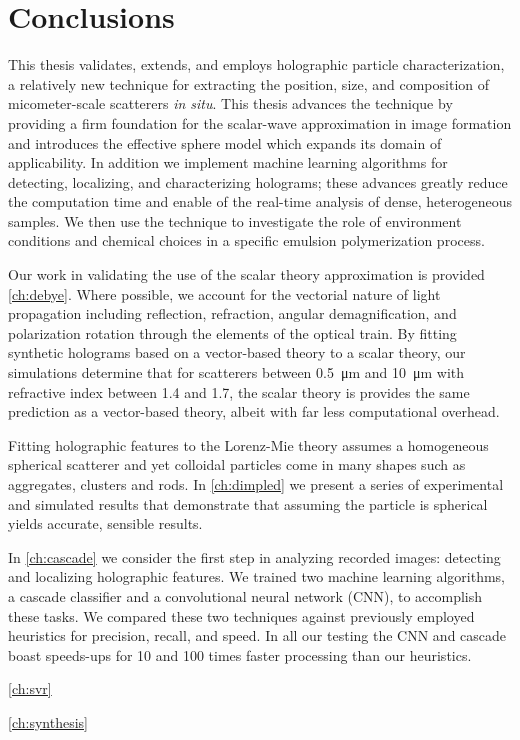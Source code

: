 \chapter{Conclusions}
\label{ch:conclusion}


This thesis validates, extends, and employs holographic
particle characterization, a relatively new technique
for extracting the position, size, and composition
of micometer-scale scatterers \emph{in situ}. This
thesis advances the technique by providing a
firm foundation for the scalar-wave approximation
in image formation and introduces the effective
sphere model which expands its domain of applicability.
In addition we implement machine learning algorithms for
detecting, localizing, and characterizing holograms; these
advances greatly reduce the computation time and enable of
the real-time analysis of dense, heterogeneous samples.
We then use the technique to investigate the role of
environment conditions and chemical choices in
a specific emulsion polymerization process.

Our work in validating the use of the scalar theory
approximation is provided \autoref{ch:debye}.
Where possible, we account for the vectorial nature
of light propagation including reflection, refraction,
angular demagnification, and polarization rotation
through the elements of the optical train. By fitting synthetic holograms
based on a vector-based theory to a scalar theory,
our simulations determine that for scatterers between \SI{0.5}{\um}
and \SI{10}{\um} with refractive index between \SI{1.4}{} and \SI{1.7}{},
the scalar theory is provides the same prediction as a vector-based theory,
albeit with far less computational overhead. 

Fitting holographic features to the Lorenz-Mie theory
assumes a homogeneous spherical scatterer and yet colloidal particles
come in many shapes such as aggregates, clusters and rods. In \autoref{ch:dimpled}
we present a series of experimental and simulated results that demonstrate
that assuming the particle is spherical yields accurate, sensible results.

In \autoref{ch:cascade} we consider the first step in analyzing recorded
images: detecting and localizing holographic features. We trained two machine
learning algorithms, a cascade classifier and a convolutional neural network (CNN),
to accomplish these tasks. We compared these two techniques against previously
employed heuristics for precision, recall, and speed. In all our testing
the CNN and cascade boast speeds-ups for \num{10} and \num{100} times
faster processing than our heuristics. 

\autoref{ch:svr}

\autoref{ch:synthesis}

